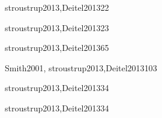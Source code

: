 \begin{syllabus}
\begin{unit}{\PLVirtualMachinesDef}{stroustrup2013,Deitel2013}{2}{2}
   \begin{learningoutcomes}
      \item \PLVirtualMachinesObjONE
      \item \PLVirtualMachinesObjTWO
      \item \PLVirtualMachinesObjTHREE
   \end{learningoutcomes}
\end{unit}

\begin{unit}{\PLDeclarationsAndTypesDef}{stroustrup2013,Deitel2013}{2}{3}
   \begin{topics}
      \item \PLDeclarationsAndTypesTopicThe%
      \item \PLDeclarationsAndTypesTopicDeclaration%
      \item \PLDeclarationsAndTypesTopicOverview%
   \end{topics}

   \begin{learningoutcomes}
	\item \PLDeclarationsAndTypesObjONE
	\item \PLDeclarationsAndTypesObjTWO
	\item \PLDeclarationsAndTypesObjTHREE
	\item \PLDeclarationsAndTypesObjFOUR
	\item \PLDeclarationsAndTypesObjFIVE
   \end{learningoutcomes}
\end{unit}

\begin{unit}{\PFFundamentalConstructsDef}{stroustrup2013,Deitel2013}{6}{5}
    \PFFundamentalConstructsAllTopics
    \PFFundamentalConstructsAllObjectives
\end{unit}

\begin{unit}{\PLObjectOrientedProgrammingDef}{Smith2001, stroustrup2013,Deitel2013}{10}{3}
   \PLObjectOrientedProgrammingAllTopics
   \PLObjectOrientedProgrammingAllObjectives
\end{unit}

\begin{unit}{\PFAlgorithmsAndProblemSolvingDef}{stroustrup2013,Deitel2013}{3}{4}
    \PFAlgorithmsAndProblemSolvingAllTopics
    \PFAlgorithmsAndProblemSolvingAllObjectives
\end{unit}

\begin{unit}{\PFRecursionDef}{stroustrup2013,Deitel2013}{3}{4}
    \PFRecursionAllTopics
    \PFRecursionAllObjectives
\end{unit}


\end{syllabus}
